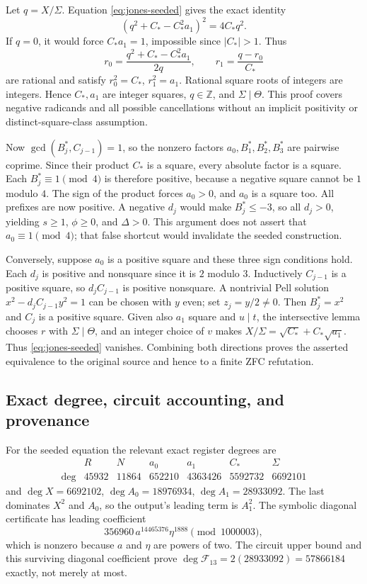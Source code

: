 Let $q=X/\Sigma$. Equation \eqref{eq:jones-seeded} gives the exact identity
\[
 (q^2+C_*-C_*^2a_1)^2=4C_*q^2.
\]
If $q=0$, it would force $C_*a_1=1$, impossible since $|C_*|>1$.
Thus
\[
 r_0=\frac{q^2+C_*-C_*^2a_1}{2q},\qquad
 r_1=\frac{q-r_0}{C_*}
\]
are rational and satisfy $r_0^2=C_*$, $r_1^2=a_1$.
Rational square roots of integers are integers. Hence $C_*,a_1$ are
integer squares, $q\in\mathbb Z$, and $\Sigma\mid\Theta$.
This proof covers negative radicands and all possible cancellations without
an implicit positivity or distinct-square-class assumption.

Now $\gcd(B_j^*,C_{j-1})=1$, so the nonzero factors
$a_0,B_1^*,B_2^*,B_3^*$ are pairwise coprime. Since their product $C_*$
is a square, every absolute factor is a square. Each $B_j^*\equiv1\pmod4$
is therefore positive, because a negative square cannot be $1$ modulo $4$.
The sign of the product forces $a_0>0$, and $a_0$ is a square too.
All prefixes are now positive. A negative $d_j$ would make
$B_j^*\le-3$, so all $d_j>0$, yielding $s\ge1$, $\phi\ge0$, and
$\Delta>0$. This argument does not assert that $a_0\equiv1\pmod4$;
that false shortcut would invalidate the seeded construction.

Conversely, suppose $a_0$ is a positive square and these three sign
conditions hold. Each $d_j$ is positive and nonsquare since it is $2$
modulo $3$. Inductively $C_{j-1}$ is a positive square, so
$d_jC_{j-1}$ is positive nonsquare. A nontrivial Pell solution
$x^2-d_jC_{j-1}y^2=1$ can be chosen with $y$ even; set $z_j=y/2\ne0$.
Then $B_j^*=x^2$ and $C_j$ is a positive square. Given also $a_1$ square
and $u\mid t$, the intersective lemma chooses $r$ with
$\Sigma\mid\Theta$, and an integer choice of $v$ makes
$X/\Sigma=\sqrt{C_*}+C_*\sqrt{a_1}$.
Thus \eqref{eq:jones-seeded} vanishes. Combining both directions proves
the asserted equivalence to the original source and hence to a finite ZFC
refutation.

\subsection{Exact degree, circuit accounting, and provenance}
For the seeded equation the relevant exact register degrees are
\[
\begin{array}{c|rrrrrr}
 &R&N&a_0&a_1&C_*&\Sigma\\\hline
 \deg&45932&11864&652210&4363426&5592732&6692101
\end{array}
\]
and $\deg X=6692102$, $\deg A_0=18976934$,
$\deg A_1=28933092$. The last dominates $X^2$ and $A_0$, so the
output's leading term is $A_1^2$. The symbolic diagonal certificate has
leading coefficient
\[
 356960\,a^{14465376}\eta^{1888}\pmod{1000003},
\]
which is nonzero because $a$ and $\eta$ are powers of two.
The circuit upper bound and this surviving diagonal coefficient prove
$\deg\mathcal F_{13}=2(28933092)=57866184$ exactly, not merely at most.

